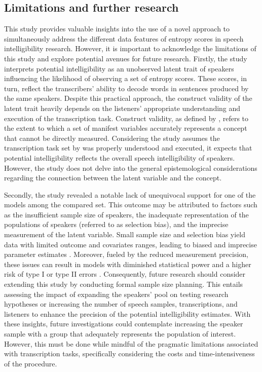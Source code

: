 \documentclass[
  authoryear,
  preprint,
  1p]{elsarticle}
\begin{document}
\subsection{Limitations and further research}\label{sec-D-LFR}

This study provides valuable insights into the use of a novel approach
to simultaneously address the different data features of entropy scores
in speech intelligibility research. However, it is important to
acknowledge the limitations of this study and explore potential avenues
for future research. Firstly, the study interprets potential
intelligibility as an unobserved latent trait of speakers influencing
the likelihood of observing a set of entropy scores. These scores, in
turn, reflect the transcribers' ability to decode words in sentences
produced by the same speakers. Despite this practical approach, the
construct validity of the latent trait heavily depends on the listeners'
appropriate understanding and execution of the transcription task.
Construct validity, as defined by \citet{Cronbach_et_al_1955}, refers to
the extent to which a set of manifest variables accurately represents a
concept that cannot be directly measured. Considering the study assumes
the transcription task set by \citet{Boonen_et_al_2021} was properly
understood and executed, it expects that potential intelligibility
reflects the overall speech intelligibility of speakers. However, the
study does not delve into the general epistemological considerations
regarding the connection between the latent variable and the concept.

Secondly, the study revealed a notable lack of unequivocal support for
one of the models among the compared set. This outcome may be attributed
to factors such as the insufficient sample size of speakers, the
inadequate representation of the populations of speakers (referred to as
selection bias), and the imprecise measurement of the latent variable.
Small sample size and selection bias yield data with limited outcome and
covariates ranges, leading to biased and imprecise parameter estimates
\citep{Everitt_et_al_2010}. Moreover, fueled by the reduced measurement
precision, these issues can result in models with diminished statistical
power and a higher risk of type I or type II errors
\citep{McElreath_2020}. {Consequently, future research should consider
extending this study by conducting formal sample size planning. This
entails assessing the impact of expanding the speakers' pool on testing
research hypotheses or increasing the number of speech samples,
transcriptions, and listeners to enhance the precision of the potential
intelligibility estimates. With these insights, future investigations
could contemplate increasing the speaker sample with a group that
adequately represents the population of interest.} However, this must be
done while mindful of the pragmatic limitations associated with
transcription tasks, specifically considering the costs and
time-intensiveness of the procedure.
\end{document}
